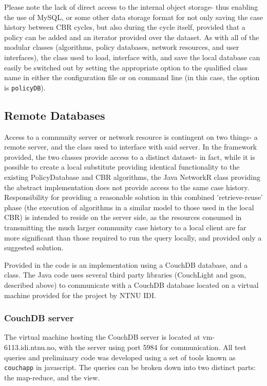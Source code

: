 Please note the lack of direct access to the internal object storage- thus enabling the use of MySQL, or some other data storage format for not only saving the case history between CBR cycles, but also during the cycle itself, provided that a policy can be added and an iterator provided over the dataset. As with all of the modular classes (algorithms, policy databases, network resources, and user interfaces), the class used to load, interface with, and save the local database can easily be switched out by setting the appropriate  option to the qualified class name in either the configuration file or on command line (in this case, the option is \texttt{policyDB}).

\subsection{Remote Databases}  %
Access to a community server or network resource is contingent on two things- a remote server, and the class used to interface with said server. In the framework provided, the two classes provide access to a distinct dataset- in fact, while it is possible to create a local substitute providing identical functionality to the existing PolicyDatabase and CBR algorithms, the Java NetworkR class providing the abstract implementation does not provide access to the same case history. Responsibility for providing a reasonable solution in this combined 'retrieve-reuse' phase (the execution of algorithms in a similar model to those used in the local CBR) is intended to reside on the server side, as the resources consumed in transmitting the much larger community case history to a local client are far more significant than those required to run the query locally, and provided only a suggested solution.

Provided in the code is an implementation using a CouchDB database, and a class. The Java code uses several third party libraries (CouchLight and gson, described above) to communicate with a CouchDB database located on a virtual machine provided for the project by NTNU IDI.

\subsubsection{CouchDB server}
The virtual machine hosting the CouchDB server is located at vm-6113.idi.ntnu.no, with the server using port 5984 for communication. All test queries and preliminary code was developed using a set of tools known as \texttt{couchapp} in javascript. The queries can be broken down into two distinct parts: the map-reduce, and the view. 


